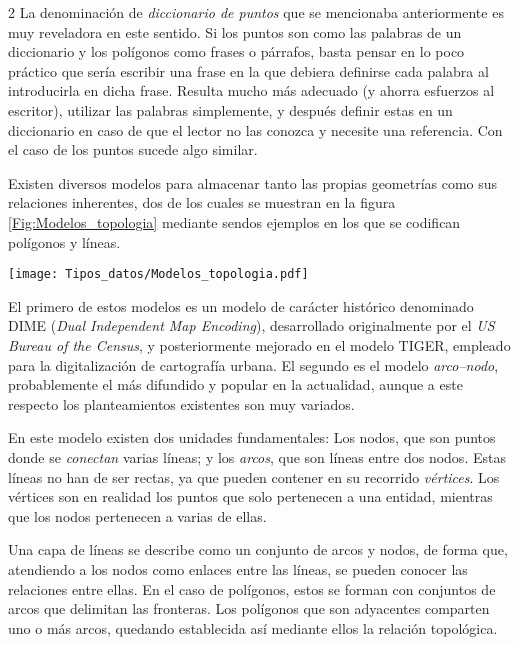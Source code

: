 \begin{multicols}{2}
La denominación de \emph{diccionario de puntos} que se mencionaba anteriormente es muy reveladora en este sentido. Si los puntos son como las palabras de un diccionario y los polígonos como frases o párrafos, basta pensar en lo poco práctico que sería escribir una frase en la que debiera definirse cada palabra al introducirla en dicha frase. Resulta mucho más adecuado (y ahorra esfuerzos al escritor), utilizar las palabras simplemente, y después definir estas en un diccionario en caso de que el lector no las conozca y necesite una referencia. Con el caso de los puntos sucede algo similar.

Existen diversos modelos para almacenar tanto las propias geometrías como sus relaciones inherentes, dos de los cuales se muestran en la figura \ref{Fig:Modelos_topologia} mediante sendos ejemplos en los que se codifican polígonos y líneas.

\begin{figure*}[ht]   
\centering
\texttt{[image: Tipos\_datos/Modelos\_topologia.pdf]}
\caption{\small Dos modelos para representar la topología de líneas y polígonos. a) DIME, b) arco--nodo.}
\label{Fig:Modelos_topologia} 
\end{figure*}

El primero de estos modelos es un modelo de carácter histórico denominado DIME (\emph{Dual Independent Map Encoding}), desarrollado originalmente por el \emph{US Bureau of the Census}, y posteriormente mejorado en el modelo TIGER, empleado para la digitalización de cartografía urbana. El segundo es el modelo \emph{arco--nodo}, probablemente el más difundido y popular en la actualidad, aunque a este respecto los planteamientos existentes son muy variados.

En este modelo existen dos unidades fundamentales: Los nodos, que son puntos donde se \emph{conectan} varias líneas; y los \emph{arcos}, que son líneas entre dos nodos. Estas líneas no han de ser rectas, ya que pueden contener en su recorrido \emph{vértices}. Los vértices son en realidad los puntos que solo pertenecen a una entidad, mientras que los nodos pertenecen a varias de ellas.

Una capa de líneas se describe como un conjunto de arcos y nodos, de forma que, atendiendo a los nodos como enlaces entre las líneas, se pueden conocer las relaciones entre ellas. En el caso de polígonos, estos se forman con conjuntos de arcos que delimitan las fronteras. Los polígonos que son adyacentes comparten uno o más arcos, quedando establecida así mediante ellos la relación topológica.


\end{multicols}
